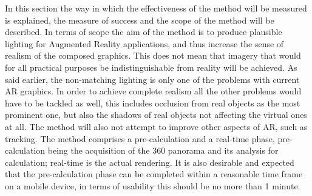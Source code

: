 
In this section the way in which the effectiveness of the method will be measured is explained, the measure of success and the scope of the method will be described. In terms of scope the aim of the method is to produce plausible lighting for Augmented Reality applications, and thus increase the sense of realism of the composed graphics. This does not mean that imagery that would for all practical purposes be indistinguishable from reality will be achieved. As said earlier, the non-matching lighting is only one of the problems with current AR graphics. In order to achieve complete realism all the other problems would have to be tackled as well, this includes occlusion from real objects as the most prominent one, but also the shadows of real objects not affecting the virtual ones at all. The method will also not attempt to improve other aspects of AR, such as tracking. The method comprises a pre-calculation and a real-time phase, pre-calculation being the acquisition of the 360 panorama and its analysis for calculation; real-time is the actual rendering. It is also desirable and expected that the pre-calculation phase can be completed within a reasonable time frame on a mobile device, in terms of usability this should be no more than 1 minute.\newline
